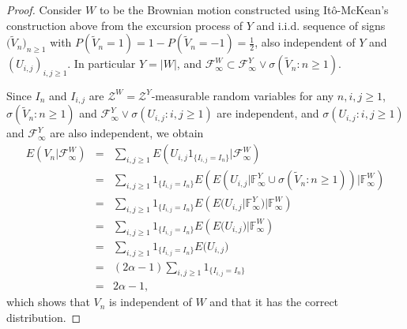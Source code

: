 \documentclass[reqno]{amsart}
\theoremstyle{definition}
\theoremstyle{remark}
\numberwithin{equation}{section}
\begin{document}
\begin{proof}
Consider $W$ to be the Brownian motion constructed using It\^{o}-McKean's construction above from the excursion process of $Y$ and i.i.d. sequence of signs $\big(\widetilde{V}_n\big)_{n\ge 1}$ with $P(\widetilde{V}_n=1)=1-P(\widetilde{V}_n=-1)=\frac12$, also independent of $Y$ and $(U_{i,j})_{i,j\ge 1}$. In particular $Y=\vert W\vert$, and $\mathcal{F}^W_\infty\subset \mathcal{F}^Y_\infty\vee \sigma(\widetilde{V}_n:n\ge 1)$.

Since $I_n$ and $I_{i,j}$ are $\mathcal{Z}^W=\mathcal{Z}^Y$-measurable random variables for any $n,i,j\ge 1$, $\sigma(\widetilde{V}_n:n\ge 1)$ and $\mathcal{F}^Y_\infty \vee \sigma(U_{i,j}:i,j\ge 1)$ are independent, and $\sigma(U_{i,j}:i,j\ge 1)$ and $\mathcal{F}^Y_\infty$ are also independent, we obtain
\begin{eqnarray*}
E(V_n \vert \mathcal{F}^W_\infty)&=&\sum_{i,j\ge 1} E\left(U_{i,j} 1_{\{I_{i,j}=I_{n}\}}\big\vert \mathcal{F}^W_\infty\right)\\
&=&\sum_{i,j\ge 1} 1_{\{I_{i,j}=I_{n}\}} E\left(E\left(U_{i,j} \big\vert \mathbb{F}^Y_\infty \cup \sigma(\widetilde{V}_n:n\ge 1)\right) \Big\vert \mathbb{F}^W_\infty\right)\\
&=&\sum_{i,j\ge 1} 1_{\{I_{i,j}=I_{n}\}} E\left(E\big(U_{i,j} \vert \mathbb{F}^Y_\infty \big) \big\vert \mathbb{F}^W_\infty\right)\\
&=&\sum_{i,j\ge 1} 1_{\{I_{i,j}=I_{n}\}} E\left(E\big(U_{i,j}\big) \big\vert \mathbb{F}^W_\infty\right)\\
&=&\sum_{i,j\ge 1} 1_{\{I_{i,j}=I_{n}\}} E\big(U_{i,j}\big)\\
&=&(2\alpha-1)\sum_{i,j\ge 1} 1_{\{I_{i,j}=I_{n}\}} \\
&=&2\alpha -1,
\end{eqnarray*}
which shows that ${V}_n$ is independent of $W$ and that it has the correct distribution.


\end{proof}
\end{document}
